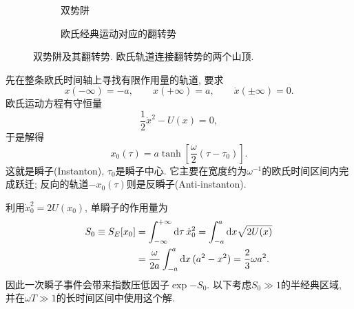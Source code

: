 \begin{figure}[!htbp]
    \centering
    \begin{subfigure}{0.46\textwidth}
        \centering
        \caption{双势阱}
    \end{subfigure}\hfill
    \begin{subfigure}{0.46\textwidth}
        \centering
        \caption{欧氏经典运动对应的翻转势}
    \end{subfigure}
    \caption{双势阱及其翻转势. 欧氏轨道连接翻转势的两个山顶.}
    \label{fig:ssb-double-well}
\end{figure}

先在整条欧氏时间轴上寻找有限作用量的轨道, 要求
\begin{equation}
    x(-\infty)=-a,\qquad x(+\infty)=a,\qquad
    \dot x(\pm\infty)=0.
\end{equation}
欧氏运动方程有守恒量
\begin{equation}
    \frac12\dot x^2-U(x)=0,
\end{equation}
于是解得
\begin{equation}\label{ssb-instanton-solution}
    x_0(\tau)=a\tanh\left[\frac\omega2(\tau-\tau_0)\right].
\end{equation}
这就是瞬子(Instanton), $\tau_0$是瞬子中心. 它主要在宽度约为$\omega^{-1}$的欧氏时间区间内完成跃迁; 反向的轨道$-x_0(\tau)$则是反瞬子(Anti-instanton).

利用$\dot x_0^2=2U(x_0)$, 单瞬子的作用量为
\begin{align}\label{ssb-instanton-action}
    S_0\equiv S_E[x_0]
    &=\int_{-\infty}^{+\infty}\mathrm d\tau\,\dot x_0^2
      =\int_{-a}^{a}\mathrm d x\sqrt{2U(x)}\notag\\
    &=\frac\omega{2a}\int_{-a}^{a}\mathrm d x\,(a^2-x^2)
      =\frac23\omega a^2.
\end{align}
因此一次瞬子事件会带来指数压低因子$\exp{-S_0}$. 以下考虑$S_0\gg1$的半经典区域, 并在$\omega T\gg1$的长时间区间中使用这个解.

